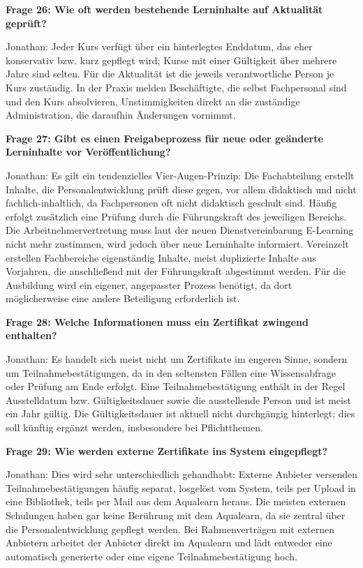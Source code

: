\documentclass[
    12pt, 
    a4paper,
    ]{scrartcl} %
\begin{document}
\medskip
\textbf{Frage 26: Wie oft werden bestehende Lerninhalte auf Aktualit\"at gepr\"uft?}

Jonathan: Jeder Kurs verf\"ugt \"uber ein hinterlegtes Enddatum, das eher konservativ bzw. kurz gepflegt wird; Kurse mit einer G\"ultigkeit \"uber mehrere Jahre sind selten. F\"ur die Aktualit\"at ist die jeweils verantwortliche Person je Kurs zust\"andig. In der Praxis melden Besch\"aftigte, die selbst Fachpersonal sind und den Kurs absolvieren, Unstimmigkeiten direkt an die zust\"andige Administration, die daraufhin \"Anderungen vornimmt.

\medskip
\textbf{Frage 27: Gibt es einen Freigabeprozess f\"ur neue oder ge\"anderte Lerninhalte vor Ver\"offentlichung?}

Jonathan: Es gilt ein tendenzielles Vier-Augen-Prinzip: Die Fachabteilung erstellt Inhalte, die Personalentwicklung pr\"uft diese gegen, vor allem didaktisch und nicht fachlich-inhaltlich, da Fachpersonen oft nicht didaktisch geschult sind. H\"aufig erfolgt zus\"atzlich eine Pr\"ufung durch die F\"uhrungskraft des jeweiligen Bereichs. Die Arbeitnehmervertretung muss laut der neuen Dienstvereinbarung E-Learning nicht mehr zustimmen, wird jedoch \"uber neue Lerninhalte informiert. Vereinzelt erstellen Fachbereiche eigenst\"andig Inhalte, meist duplizierte Inhalte aus Vorjahren, die anschlie{\ss}end mit der F\"uhrungskraft abgestimmt werden. F\"ur die Ausbildung wird ein eigener, angepasster Prozess ben\"otigt, da dort m\"oglicherweise eine andere Beteiligung erforderlich ist.

\bigskip
{}

\textbf{Frage 28: Welche Informationen muss ein Zertifikat zwingend enthalten?}

Jonathan: Es handelt sich meist nicht um Zertifikate im engeren Sinne, sondern um Teilnahmebest\"atigungen, da in den seltensten F\"allen eine Wissensabfrage oder Pr\"ufung am Ende erfolgt. Eine Teilnahmebest\"atigung enth\"alt in der Regel Ausstelldatum bzw. G\"ultigkeitsdauer sowie die ausstellende Person und ist meist ein Jahr g\"ultig. Die G\"ultigkeitsdauer ist aktuell nicht durchg\"angig hinterlegt; dies soll k\"unftig erg\"anzt werden, insbesondere bei Pflichtthemen.

\medskip
\textbf{Frage 29: Wie werden externe Zertifikate ins System eingepflegt?}

Jonathan: Dies wird sehr unterschiedlich gehandhabt: Externe Anbieter versenden Teilnahmebest\"atigungen h\"aufig separat, losgel\"ost vom System, teils per Upload in eine Bibliothek, teils per Mail aus dem Aqualearn heraus. Die meisten externen Schulungen haben gar keine Ber\"uhrung mit dem Aqualearn, da sie zentral \"uber die Personalentwicklung gepflegt werden. Bei Rahmenvertr\"agen mit externen Anbietern arbeitet der Anbieter direkt im Aqualearn und l\"adt entweder eine automatisch generierte oder eine eigene Teilnahmebest\"atigung hoch.
\end{document}
